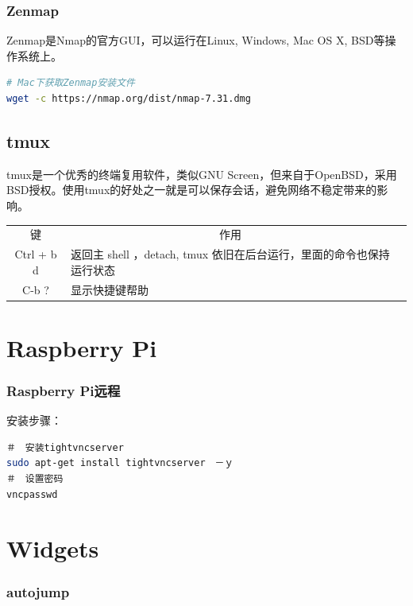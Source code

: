 \documentclass[letter]{book}
\begin{document}
\subsection{Zenmap}

Zenmap是Nmap的官方GUI，可以运行在Linux, Windows, Mac OS X, BSD等操作系统上。

\begin{lstlisting}[language=Bash]
# Mac下获取Zenmap安装文件
wget -c https://nmap.org/dist/nmap-7.31.dmg
\end{lstlisting}


\section{tmux}

tmux是一个优秀的终端复用软件，类似GNU Screen，但来自于OpenBSD，采用BSD授权。使用tmux的好处之一就是可以保存会话，避免网络不稳定带来的影响。

\begin{tabular}{|c|p{8cm}|c|}
	\hline
	\multirow{1}{*}{键}
	& \multicolumn{1}{c|}{作用}  \\			
	\cline{1-2}
	Ctrl + b d  & 返回主 shell ，detach, tmux 依旧在后台运行，里面的命令也保持运行状态\\
	\hline
	C-b ? & 显示快捷键帮助\\
	\hline
\end{tabular}


\chapter{Raspberry Pi}

\subsection{Raspberry Pi远程}

安装步骤：

\begin{lstlisting}[language=Bash]
＃　安装tightvncserver
sudo apt-get install tightvncserver　－ｙ
＃　设置密码
vncpasswd
\end{lstlisting}

\chapter{Widgets}

\subsection{autojump}
\end{document}
